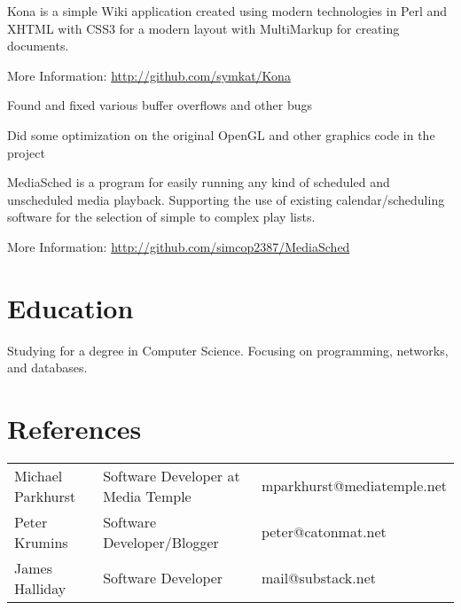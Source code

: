 \documentclass[table,tmargin=1in,bmargin=1in,letterpaper]{resume}
\begin{document}

\begin{compactitem}
\item Kona is a simple Wiki application created using modern technologies in Perl and XHTML 
with CSS3 for a modern layout with MultiMarkup for creating documents.
\item More Information: \url{http://github.com/symkat/Kona}
\end{compactitem}


\begin{compactitem}
\item Found and fixed various buffer overflows and other bugs
\item Did some optimization on the original OpenGL and other graphics code in the project
\end{compactitem}


\begin{compactitem}
\item MediaSched is a program for easily running any kind of scheduled and unscheduled media playback.  Supporting the use of existing calendar/scheduling software for the selection of simple to complex play lists.
\item More Information: \url{http://github.com/simcop2387/MediaSched}
\end{compactitem}

\section{Education}

\begin{compactitem}
\item Studying for a degree in Computer Science.  Focusing on programming, networks, and databases.
\end{compactitem}

\section{References}
\begin{tabular}{lll}
\rowcolor{white} Michael Parkhurst & Software Developer at Media Temple & mparkhurst@mediatemple.net \\
\rowcolor{lightgray} Peter Krumins & Software Developer/Blogger & peter@catonmat.net \\
\rowcolor{white} James Halliday & Software Developer & mail@substack.net
\end{tabular}
\end{document}
